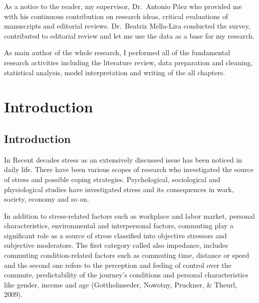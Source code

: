 \documentclass[
11pt, %
oneside, %
english, %
singlespacing, %
]{macthesis} %
\newenvironment{Shaded}{\begin{snugshade}}{\end{snugshade}}
\newcommand{\AttributeTok}[1]{\textcolor[rgb]{0.13,0.29,0.53}{#1}}
\newcommand{\ConstantTok}[1]{\textcolor[rgb]{0.56,0.35,0.01}{#1}}
\newcommand{\FunctionTok}[1]{\textcolor[rgb]{0.13,0.29,0.53}{\textbf{#1}}}
\newcommand{\NormalTok}[1]{#1}
\newcommand{\SpecialCharTok}[1]{\textcolor[rgb]{0.81,0.36,0.00}{\textbf{#1}}}
\newcommand{\StringTok}[1]{\textcolor[rgb]{0.31,0.60,0.02}{#1}}
\begin{document}
As a notice to the reader, my supervisor, Dr.~Antonio Páez who provided me with his continuous contribution on research ideas, critical evaluations of manuscripts and editorial reviews. Dr.~Beatriz Mella-Lira conducted the survey, contributed to editorial review and let me use the data as a base for my research.

As main author of the whole research, I performed all of the fundamental research activities including the literature review, data preparation and cleaning, statistical analysis, model interpretation and writing of the all chapters.
\begin{Shaded}
\end{Shaded}
\hypertarget{introduction}{%
\chapter{Introduction}\label{introduction}}

\hypertarget{introduction-1}{%
\section{Introduction}\label{introduction-1}}

In Recent decades stress as an extensively discussed issue has been noticed in daily life. There have been various scopes of research who investigated the source of stress and possible coping strategies. Psychological, sociological and physiological studies have investigated stress and its consequences in work, society, economy and so on.

In addition to stress-related factors such as workplace and labor market, personal characteristics, environmental and interpersonal factors, commuting play a significant role as a source of stress classified into objective stressors and subjective moderators. The first category called also impedance, includes commuting condition-related factors such as commuting time, distance or speed and the second one refers to the perception and feeling of control over the commute, predictability of the journey's conditions and personal characteristics like gender, income and age (Gottholmseder, Nowotny, Pruckner, \& Theurl, 2009).
\end{document}

